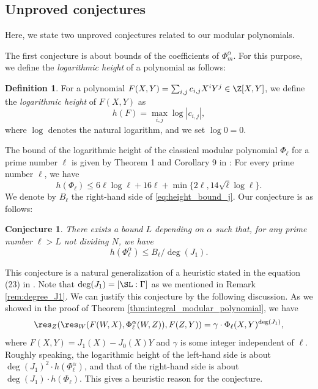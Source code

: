 \documentclass{amsart}
\newtheorem{conjecture}[theorem]{Conjecture}
\theoremstyle{definition}
\newtheorem{definition}[theorem]{Definition}
\theoremstyle{remark}
\numberwithin{equation}{section}
\begin{document}
\subsection{Unproved conjectures}\label{subsec:conjectures}
Here, we state two unproved conjectures
related to our modular polynomials.

The first conjecture is about bounds of the coefficients of $\Phi_m^\alpha$.
For this purpose,
we define the \emph{logarithmic height} of a polynomial as follows:
\begin{definition}\label{def:log_height}
    For a polynomial $F(X, Y) = \sum_{i, j} c_{i, j} X^i Y^j \in \Z[X, Y]$,
    we define the \emph{logarithmic height} of $F(X, Y)$ as
    \begin{equation*}
        h(F) = \max_{i, j} \log|c_{i, j}|,
    \end{equation*}
    where $\log$ denotes the natural logarithm,
    and we set $\log 0 = 0$.
\end{definition}
The bound of the logarithmic height of the classical modular polynomial $\Phi_\ell$
for a prime number $\ell$
is given by Theorem 1 and Corollary 9 in \cite{BS2010heigh_modular}:
For every prime number $\ell$, we have
\begin{equation}\label{eq:height_bound_j}
    h(\Phi_\ell) \leq 6\ell\log\ell + 16\ell + \min\{2\ell, 14\sqrt{\ell}\log\ell\}.
\end{equation}
We denote by $B_\ell$ the right-hand side of \eqref{eq:height_bound_j}.
Our conjecture is as follows:
\begin{conjecture}\label{conj:height_bound}
    There exists a bound $L$ depending on $\alpha$
    such that,
    for any prime number $\ell > L$ not dividing $N$, we have
    \begin{equation*}
        h(\Phi_\ell^{\alpha}) \leq B_\ell / \deg(J_1).
    \end{equation*}
\end{conjecture}
This conjecture is a natural generalization of a heuristic
stated in the equation (23) in \cite{BS2010heigh_modular}.
Note that $\deg(J_1) = [\SL : \Gamma]$
as we mentioned in Remark \ref{rem:degree_J1}.
We can justify this conjecture by the following discussion.
As we showed in the proof of Theorem \ref{thm:integral_modular_polynomial},
we have
\begin{equation*}
    \res_Z(\res_W(F(W, X), \Phi_\ell^\alpha(W, Z)), F(Z, Y)) = \gamma \cdot \Phi_\ell(X, Y)^{\deg(J_1)},
\end{equation*}
where $F(X, Y) = J_1(X) - J_0(X) Y$
and $\gamma$ is some integer independent of $\ell$.
Roughly speaking,
the logarithmic height of the left-hand side
is about $\deg(J_1)^2 \cdot h(\Phi_\ell^\alpha)$,
and that of the right-hand side is about $\deg(J_1) \cdot h(\Phi_\ell)$.
This gives a heuristic reason for the conjecture.
\end{document}
